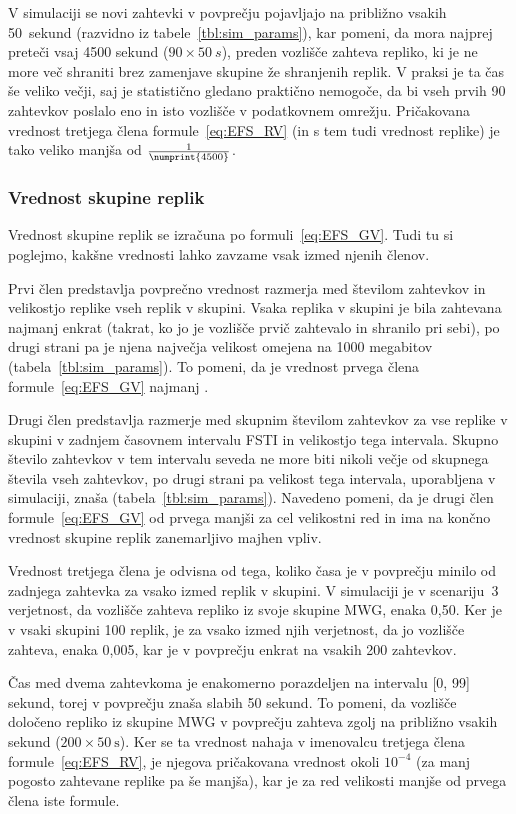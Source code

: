 \documentclass[a4paper, 12pt]{book}
\begin{document}
V simulaciji se novi zahtevki v povprečju pojavljajo na približno vsakih
50~sekund (razvidno iz tabele~\ref{tbl:sim_params}), kar pomeni, da mora
najprej preteči vsaj 4500 sekund ($90 \times 50\:s$), preden vozlišče
zahteva repliko, ki je ne more več shraniti brez zamenjave skupine
že shranjenih replik. V praksi je ta čas še veliko večji, saj je statistično
gledano praktično nemogoče, da bi vseh prvih 90 zahtevkov poslalo eno in isto
vozlišče v podatkovnem omrežju. Pričakovana vrednost tretjega člena
formule~\eqref{eq:EFS_RV} (in s tem tudi vrednost replike) je tako veliko
manjša od $\frac{1}{\numprint{4500}}$.

\subsubsection{Vrednost skupine replik}

Vrednost skupine replik se izračuna po formuli~\eqref{eq:EFS_GV}. Tudi tu si
poglejmo, kakšne vrednosti lahko zavzame vsak izmed njenih členov.

Prvi člen predstavlja povprečno vrednost razmerja med številom zahtevkov in
velikostjo replike vseh replik v skupini. Vsaka replika v skupini je bila
zahtevana najmanj enkrat (takrat, ko jo je vozlišče prvič zahtevalo in shranilo
pri sebi), po drugi strani pa je njena največja velikost omejena na
1000 megabitov (tabela~\ref{tbl:sim_params}). To pomeni, da je vrednost
prvega člena formule~\eqref{eq:EFS_GV} najmanj .

Drugi člen predstavlja razmerje med skupnim številom zahtevkov za vse replike
v skupini v zadnjem časovnem intervalu FSTI in velikostjo tega intervala.
Skupno število zahtevkov v tem intervalu seveda ne more biti nikoli večje od
skupnega števila vseh zahtevkov, po drugi strani pa velikost tega intervala,
uporabljena v simulaciji, znaša  (tabela~\ref{tbl:sim_params}).
Navedeno pomeni, da je drugi člen formule~\eqref{eq:EFS_GV} od prvega manjši za
cel velikostni red in ima na končno vrednost skupine replik zanemarljivo
majhen vpliv.

Vrednost tretjega člena je odvisna od tega, koliko časa je v povprečju minilo
od zadnjega zahtevka za vsako izmed replik v skupini. V simulaciji je v
scenariju~3 verjetnost, da vozlišče zahteva repliko iz svoje
skupine MWG, enaka 0,50. Ker je v vsaki skupini 100 replik, je za vsako
izmed njih verjetnost, da jo vozlišče zahteva, enaka 0,005, kar je v
povprečju enkrat na vsakih 200 zahtevkov.

Čas med dvema zahtevkoma je enakomerno porazdeljen na intervalu [0, 99] sekund,
torej v povprečju znaša slabih 50 sekund. To pomeni, da vozlišče določeno
repliko iz skupine MWG v povprečju zahteva zgolj na približno vsakih
 sekund ($200 \times 50\:\text{s}$).
Ker se ta vrednost nahaja v imenovalcu tretjega člena
formule~\eqref{eq:EFS_RV}, je njegova pričakovana vrednost okoli $10^{-4}$ (za
manj pogosto zahtevane replike pa še manjša), kar je za red velikosti manjše
od prvega člena iste formule.
\end{document}
